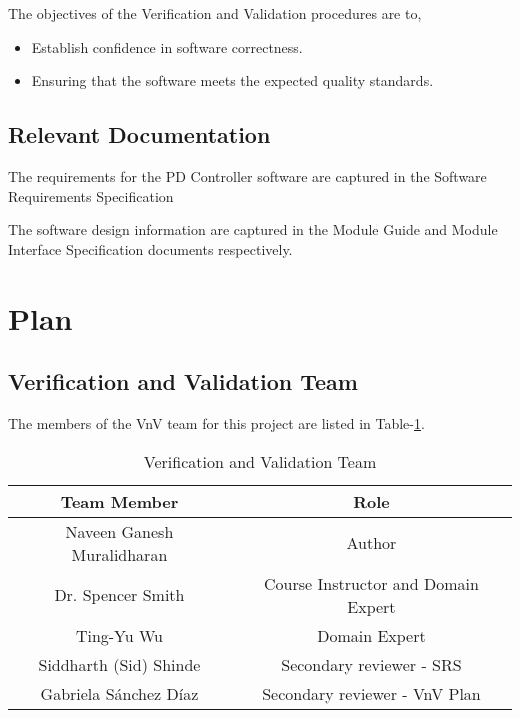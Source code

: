 \documentclass[12pt, titlepage]{article}
\begin{document}
The objectives of the Verification and Validation procedures are to,

\begin{itemize}
\item Establish confidence in software correctness.
\item Ensuring that the software meets the expected quality standards.
\end{itemize}

\subsection{Relevant Documentation}


The requirements for the PD Controller software are captured in the Software
Requirements Specification \cite{SRS}

The software design information are captured in the Module Guide  \cite{MG}
and Module Interface Specification \cite{MIS} documents respectively.

\section{Plan}
	
\subsection{Verification and Validation Team}


The members of the VnV team for this project are listed in Table-\ref{tab:VnVTeam}.

\begin{table}[]
\begin{tabular}{cc}
\hline
\multicolumn{1}{c|}{Team   Member} & Role \\ \hline
Naveen Ganesh Muralidharan      & Author    \\
Dr. Spencer Smith                     & Course Instructor and Domain Expert    \\
Ting-Yu Wu                               & Domain Expert    \\
Siddharth (Sid) Shinde               & Secondary reviewer - SRS    \\
Gabriela Sánchez Díaz	               & Secondary reviewer - VnV Plan \\   
\end{tabular}
\caption{Verification and Validation Team}
\label{tab:VnVTeam}
\end{table}
\end{document}
